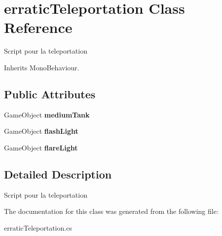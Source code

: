 \hypertarget{classerratic_teleportation}{\section{erratic\+Teleportation Class Reference}
\label{classerratic_teleportation}
}


Script pour la teleportation  




Inherits Mono\+Behaviour.

\subsection*{Public Attributes}
\begin{DoxyCompactItemize}
\item 
\hypertarget{classerratic_teleportation_a3158a65cfacb50cece4eec0fdf7be059}{Game\+Object {\bfseries medium\+Tank}}\label{classerratic_teleportation_a3158a65cfacb50cece4eec0fdf7be059}

\item 
\hypertarget{classerratic_teleportation_a1e6e17af610761ac57328cb12e993376}{Game\+Object {\bfseries flash\+Light}}\label{classerratic_teleportation_a1e6e17af610761ac57328cb12e993376}

\item 
\hypertarget{classerratic_teleportation_aa0f63bcbb5dedf9209bcac910e5a9f76}{Game\+Object {\bfseries flare\+Light}}\label{classerratic_teleportation_aa0f63bcbb5dedf9209bcac910e5a9f76}

\end{DoxyCompactItemize}


\subsection{Detailed Description}
Script pour la teleportation 



The documentation for this class was generated from the following file\+:\begin{DoxyCompactItemize}
\item 
erratic\+Teleportation.\+cs\end{DoxyCompactItemize}
